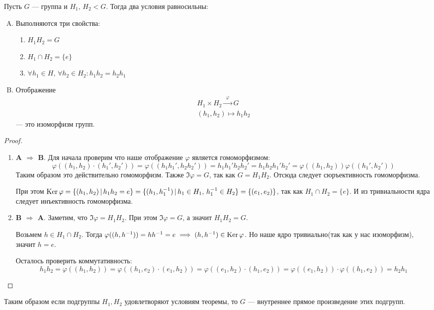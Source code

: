 \documentclass[../main.tex]{subfiles}
\begin{document}
\begin{theorem}
  Пусть $G$ --- группа и $H_1,\, H_2 < G$. Тогда два условия равносильны:
  \begin{enumerate}[A.]
    \item Выполняются три свойства:
    \begin{enumerate}[1)]
      \item $H_1H_2 = G$
      \item $H_1 \cap H_2 = \{e\}$
      \item $\forall h_1 \in H,\, \forall h_2 \in H_2\colon h_1h_2 = h_2h_1$
    \end{enumerate}
    \item Отображение
    \begin{equation*}
      \begin{gathered}
        H_1 \times H_2 \xrightarrow{\;\, \varphi \;\,} G \\
        (h_1, h_2) \mapsto h_1h_2
      \end{gathered}
    \end{equation*}
    --- это изоморфизм групп.
  \end{enumerate}
\end{theorem}
\begin{proof}
  \begin{enumerate}
    \item[] \textbf{A $\Rightarrow$ B}. Для начала проверим что наше отображение $\varphi$ является гомоморфизмом:
    \begin{equation*}
      \varphi((h_1, h_2) \cdot (h_1', h_2')) =
      \varphi((h_1h_1', h_2h_2')) =
      h_1h_1'h_2h_2' =
      h_1h_2h_1'h_2' =
      \varphi((h_1, h_2))\varphi((h_1', h_2'))
    \end{equation*}
    Таким образом это действительно гомоморфизм. Также $\Im \varphi = G$, так как $G = H_1H_2$. Отсюда следует сюръективность гомоморфизма.

    При этом $\operatorname{Ker} \varphi = \{(h_1, h_2) \, | \, h_1h_2 = e\} = \{(h_1, h_1^{-1}) \, | \, h_1 \in H_1, \, h_1^{-1} \in H_2\} = \{(e_1, e_2)\}$, так как $H_1 \cap H_2 = \{e\}$. И из тривиальности ядра следует инъективность гомоморфизма.
    \item[] \textbf{B $\Rightarrow$ A}.
    Заметим, что $\Im \varphi = H_1H_2$. При этом $\Im \varphi = G$, а значит $H_1H_2 = G$.

    Возьмем $h \in H_1 \cap H_2$. Тогда $\varphi((h, h^{-1})) = hh^{-1} = e \implies (h, h^{-1}) \in \operatorname{Ker} \varphi$. Но наше ядро тривиально(так как у нас изоморфизм), значит $h = e$.

    Осталось проверить коммутативность:
    \begin{equation*}
    h_1h_2 = \varphi((h_1, h_2)) = \varphi((h_1, e_2) \cdot (e_1, h_2)) = \varphi((e_1, h_2) \cdot (h_1, e_2)) = \varphi((e_1, h_2)) \cdot \varphi((h_1, e_2)) = h_2h_1
    \end{equation*}
  \end{enumerate}
\end{proof}
  Таким образом если подгруппы $H_1, H_2$ удовлетворяют условиям теоремы, то $G$ --- внутреннее прямое произведение этих подгрупп.
\end{document}
